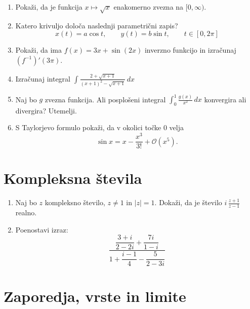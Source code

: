 \documentclass[a4paper,12pt]{article}
\begin{document}
\begin{enumerate}
\item
Pokaži, da je funkcija \(x \mapsto \sqrt{x}\) enakomerno zvezna na \([0, \infty)\).

\item
Katero krivuljo določa naslednji parametrični zapis?
\[
x(t) = a \cos t, \qquad %
y(t) = b \sin t, \qquad %
t \in [0, 2 \pi]
\]

\item
Pokaži, da ima \(f(x) = 3x + \sin(2x)\) inverzno funkcijo in izračunaj \((f^{-1})'(3 \pi)\).

\item
Izračunaj integral  \(\displaystyle \int \frac{2+\sqrt{x+1}}{(x+1)^2-\sqrt{x+1}} \,dx \)



\item
Naj bo \(g\) zvezna funkcija. Ali posplošeni integral
\(\int_{0}^{1} \frac{g(x)}{x^2} \,dx\)
konvergira ali divergira? Utemelji.

\item
S Taylorjevo formulo pokaži, da v okolici točke \(0\) velja
\[\sin x = x - \frac{x^3}{3!} + \mathcal{O}(x^5).\]
\end{enumerate}

\section*{Kompleksna števila}

\begin{enumerate}
\item
Naj bo \(z\) kompleksno število, \(z \ne 1\) in \(|z| = 1\).
Dokaži, da je število \( i \, \frac{z+1}{z-1} \) realno.

\item
Poenostavi izraz:
\[\frac{\dfrac{3 + i}{2 - 2i} + \dfrac{7i}{1 - i}}{1 + \dfrac{i - 1}{4}-\dfrac{5}{2 - 3i}}\]
\end{enumerate}

\section*{Zaporedja, vrste in limite}
\end{document}
